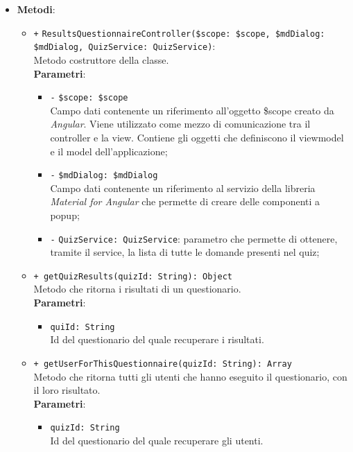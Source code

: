 \begin{itemize}
\begin{itemize}
	\end{itemize}
	\item \textbf{Metodi}:
	\begin{itemize}
		\item \texttt{+} \texttt{ResultsQuestionnaireController(\$scope: \$scope, \$mdDialog: \$mdDialog, QuizService: QuizService)}: \\Metodo costruttore della classe. \\
		\textbf{Parametri}: 
		\begin{itemize}
			\item \texttt{-} \texttt{\$scope: \$scope} \\
			Campo dati contenente un riferimento all’oggetto \$scope creato da \textit{Angular}. Viene utilizzato come mezzo di comunicazione tra il controller e la view. Contiene gli oggetti che definiscono il viewmodel e il model dell’applicazione;
			\item \texttt{-} \texttt{\$mdDialog: \$mdDialog} \\
			Campo dati contenente un riferimento al servizio della libreria \textit{Material for Angular} che permette di creare delle componenti a popup;
			\item \texttt{-} \texttt{QuizService: QuizService}: parametro che permette di ottenere, tramite il service, la lista di tutte le domande presenti nel quiz;
		\end{itemize}
		\item \texttt{+ getQuizResults(quizId: String): Object} \\ Metodo che ritorna i risultati di un questionario. \\
		\textbf{Parametri}:
		\begin{itemize}
			\item \texttt{quiId: String} \\ Id del questionario del quale recuperare i risultati.
		\end{itemize}
		\item \texttt{+ getUserForThisQuestionnaire(quizId: String): Array} \\ Metodo che ritorna tutti gli utenti che hanno eseguito il questionario, con il loro risultato. \\
		\textbf{Parametri}:
		\begin{itemize}
			\item \texttt{quizId: String} \\ Id del questionario del quale recuperare gli utenti.
		\end{itemize}
	\end{itemize}
\end{itemize}

